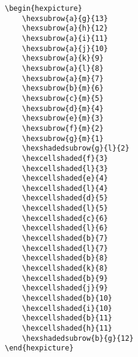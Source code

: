 \documentclass[a4paper,12pt]{article}
\begin{document}
    \begin{verbatim}\begin{hexpicture}
    \hexsubrow{a}{g}{13}
    \hexsubrow{a}{h}{12}
    \hexsubrow{a}{i}{11}
    \hexsubrow{a}{j}{10}
    \hexsubrow{a}{k}{9}
    \hexsubrow{a}{l}{8}
    \hexsubrow{a}{m}{7}
    \hexsubrow{b}{m}{6}
    \hexsubrow{c}{m}{5}
    \hexsubrow{d}{m}{4}
    \hexsubrow{e}{m}{3}
    \hexsubrow{f}{m}{2}
    \hexsubrow{g}{m}{1}
    \hexshadedsubrow{g}{l}{2}
    \hexcellshaded{f}{3}
    \hexcellshaded{l}{3}
    \hexcellshaded{e}{4}
    \hexcellshaded{l}{4}
    \hexcellshaded{d}{5}
    \hexcellshaded{l}{5}
    \hexcellshaded{c}{6}
    \hexcellshaded{l}{6}
    \hexcellshaded{b}{7}
    \hexcellshaded{l}{7}
    \hexcellshaded{b}{8}
    \hexcellshaded{k}{8}
    \hexcellshaded{b}{9}
    \hexcellshaded{j}{9}
    \hexcellshaded{b}{10}
    \hexcellshaded{i}{10}
    \hexcellshaded{b}{11}
    \hexcellshaded{h}{11}
    \hexshadedsubrow{b}{g}{12}
\end{hexpicture}\end{verbatim}
    
    \begin{hexpicture}
    \end{hexpicture}
    
\end{document}
